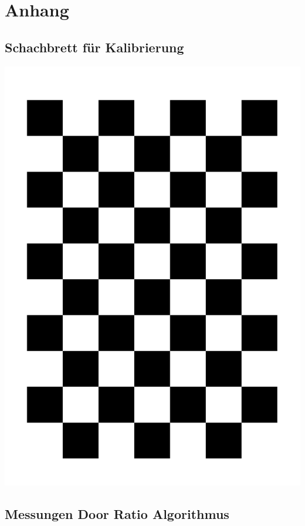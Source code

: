 \chapter{Anhang}

\section{Schachbrett für Kalibrierung}

\newpage

\includegraphics[width=\textwidth]{images/chessboard}

\section{Messungen Door Ratio Algorithmus}

